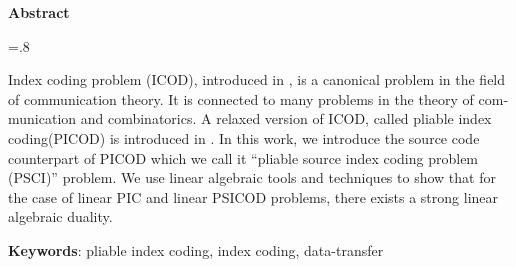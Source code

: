 


\pagestyle{empty}

\begin{latin}

\begin{center}
\textbf{Abstract}
\end{center}
\baselineskip=.8\baselineskip

Index coding problem (ICOD), introduced in \cite{4031356}, is a canonical problem in the field of communication theory. It is connected to many problems in the theory of communication and combinatorics. A relaxed version of ICOD, called pliable index coding(PICOD) is introduced in \cite{pliablefirstpaper}. 
In this work, we introduce the source code counterpart of PICOD which we call it ``pliable source index coding problem (PSCI)'' problem. We use linear algebraic tools and techniques to show that for the case of linear PIC and linear PSICOD problems, there exists a strong linear algebraic duality. 


\bigskip\noindent\textbf{Keywords}:
pliable index coding, index coding, data-transfer 

\end{latin}
